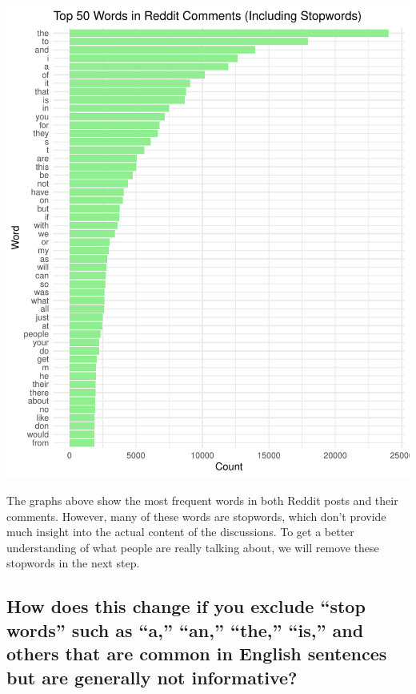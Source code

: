\documentclass[
  12pt]{article}
\begin{document}
\includegraphics{paper_files/figure-pdf/unnamed-chunk-6-2.pdf}

The graphs above show the most frequent words in both Reddit posts and
their comments. However, many of these words are stopwords, which don't
provide much insight into the actual content of the discussions. To get
a better understanding of what people are really talking about, we will
remove these stopwords in the next step.

\subsection{How does this change if you exclude ``stop words'' such as
``a,'' ``an,'' ``the,'' ``is,'' and others that are common in English
sentences but are generally not
informative?}\label{how-does-this-change-if-you-exclude-stop-words-such-as-a-an-the-is-and-others-that-are-common-in-english-sentences-but-are-generally-not-informative}
\end{document}
